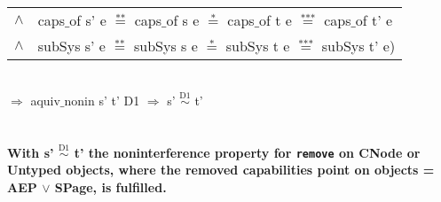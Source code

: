 \begin{itemize}
\begin{tabular}{ll}
$\wedge$ & caps$\_$of s' e $\overset{\text{**}}{=}$ caps$\_$of s e $\overset{\text{*}}{=}$ caps$\_$of t e $\overset{\text{***}}{=}$ caps$\_$of t' e \\
$\wedge$ & subSys s' e $\overset{\text{**}}{=}$ subSys s e $\overset{\text{*}}{=}$ subSys t e $\overset{\text{***}}{=}$ subSys t' e)
\end{tabular} \\
$\Rightarrow$ aquiv$\_$nonin s' t' D1 $\Rightarrow$ s' $\overset{\text{D1}}{\sim}$ t' \\ \\ \\
\textbf{With s' $\overset{\text{D1}}{\sim}$ t' the noninterference property for \texttt{remove} on CNode or Untyped objects, where the removed capabilities point on objects = AEP $\vee$ SPage, is fulfilled.}  
\clearpage
\end{itemize}
